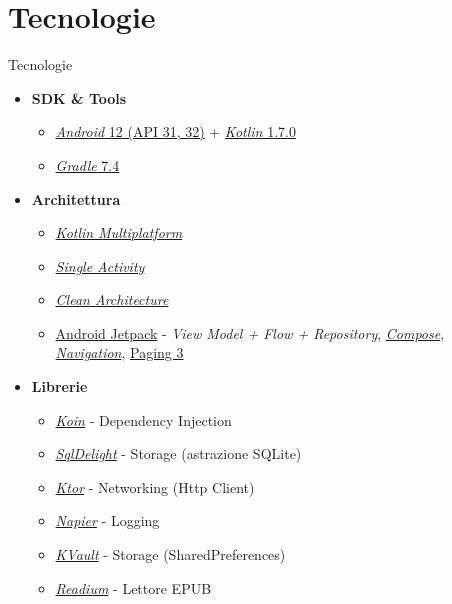 \documentclass[10pt]{beamer}
\begin{document}
\section{Tecnologie}
\begin{frame}{Tecnologie}
    \begin{itemize}
    \item \textbf{SDK \& Tools}
    \begin{itemize}
        \item \href{https://developer.android.com/about/versions/12}{\textit{Android} 12 (API 31, 32)} + \href{https://github.com/JetBrains/kotlin/releases/tag/v1.7.0}{\textit{Kotlin} 1.7.0}
        \item \href{https://docs.gradle.org/7.4/userguide/userguide.html}{\textit{Gradle} 7.4}
    \end{itemize}
    \item \textbf{Architettura}
    \begin{itemize}
        \item \href{https://kotlinlang.org/lp/mobile/}{\textit{Kotlin Multiplatform}}
        \item \href{https://developer.android.com/guide/navigation/navigation-migrate}{\textit{Single Activity}}
        \item \href{https://blog.cleancoder.com/uncle-bob/2012/08/13/the-clean-architecture.html}{\textit{Clean Architecture}}
        \item \href{https://developer.android.com/jetpack}{Android Jetpack} - \textit{View Model + Flow +  Repository}, \href{https://developer.android.com/jetpack/compose}{\textit{Compose}}, \href{https://developer.android.com/guide/navigation}{\textit{Navigation}}, \href{https://developer.android.com/topic/libraries/architecture/paging/v3-overview}{Paging 3}
    \end{itemize}
    \item \textbf{Librerie}
    \begin{itemize}
         \item \href{https://insert-koin.io/}{\textit{Koin}} - Dependency Injection
         \item \href{https://cashapp.github.io/sqldelight/}{\textit{SqlDelight}} - Storage (astrazione SQLite)
         \item \href{https://ktor.io/}{\textit{Ktor}} - Networking (Http Client)
         \item \href{https://github.com/AAkira/Napier}{\textit{Napier}} - Logging
         \item \href{https://github.com/Liftric/KVault}{\textit{KVault}} - Storage (SharedPreferences)
         \item \href{https://readium.org/}{\textit{Readium}} - Lettore EPUB
    \end{itemize}
     \end{itemize}
\end{frame}
\end{document}
